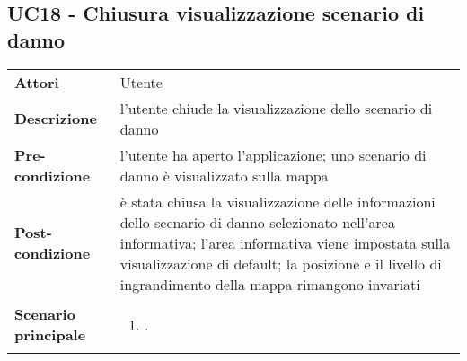 \subsection{UC18 - Chiusura visualizzazione scenario di danno} 
\label{sssec:UC18} 
\def\arraystretch{1.5}
\begin{tabularx}{\textwidth}{l|p{}}
	\rowcolor{I} \multicolumn{2}{c}{\color{white}\textbf{UC18 - Chiusura visualizzazione scenario di danno}} \\
	\toprule
	\endhead
	\textbf{Attori} & Utente\\
	\textbf{Descrizione} & l'utente chiude la visualizzazione dello scenario di danno\\
	\textbf{Pre-condizione} & l'utente ha aperto l'applicazione; uno scenario di danno è visualizzato sulla mappa\\
	\textbf{Post-condizione} & è stata chiusa la visualizzazione delle informazioni dello scenario di danno selezionato nell'area informativa; l'area informativa viene impostata sulla visualizzazione di default; la posizione e il livello di ingrandimento della mappa rimangono invariati\\
	\textbf{Scenario principale} & \vspace{-1.2em}\begin{enumerate}[leftmargin=*,noitemsep,nosep]
		\item \nameref{sssec:UC18}.
	\end{enumerate}\\
	\bottomrule
\end{tabularx}
